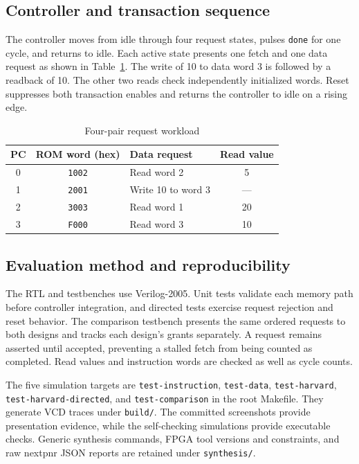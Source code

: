 \documentclass[conference]{IEEEtran}
\begin{document}
\subsection{Controller and transaction sequence}
The controller moves from idle through four request states, pulses \texttt{done} for one cycle, and returns to idle. Each active state presents one fetch and one data request as shown in Table~\ref{tab:work}. The write of 10 to data word 3 is followed by a readback of 10. The other two reads check independently initialized words. Reset suppresses both transaction enables and returns the controller to idle on a rising edge.

\begin{table}[!t]
\caption{Four-pair request workload}
\label{tab:work}
\centering
\footnotesize
\setlength{\tabcolsep}{4pt}
\begin{tabular}{cclc}
\hline
PC & ROM word (hex) & Data request & Read value\\
\hline
0 & \texttt{1002} & Read word 2 & 5\\
1 & \texttt{2001} & Write 10 to word 3 & ---\\
2 & \texttt{3003} & Read word 1 & 20\\
3 & \texttt{F000} & Read word 3 & 10\\
\hline
\end{tabular}
\end{table}

\subsection{Evaluation method and reproducibility}
The RTL and testbenches use Verilog-2005. Unit tests validate each memory path before controller integration, and directed tests exercise request rejection and reset behavior. The comparison testbench presents the same ordered requests to both designs and tracks each design's grants separately. A request remains asserted until accepted, preventing a stalled fetch from being counted as completed. Read values and instruction words are checked as well as cycle counts.

The five simulation targets are \texttt{test-instruction}, \texttt{test-data}, \texttt{test-harvard}, \texttt{test-harvard-directed}, and \texttt{test-comparison} in the root Makefile. They generate VCD traces under \texttt{build/}. The committed screenshots provide presentation evidence, while the self-checking simulations provide executable checks. Generic synthesis commands, FPGA tool versions and constraints, and raw nextpnr JSON reports are retained under \texttt{synthesis/}.
\end{document}
